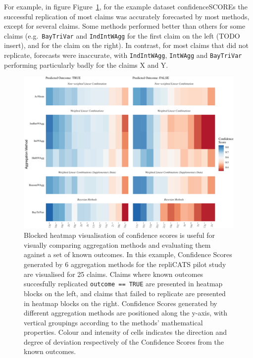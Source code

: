 \documentclass[article]{jss}
\begin{document}
For example, in figure Figure~\ref{fig-heatmap}, for the example dataset
{confidenceSCOREs} the successful replication of most claims was
accurately forecasted by most methods, except for several claims. Some
methods performed better than others for some claims
(e.g.~\texttt{BayTriVar} and \texttt{IndIntWAgg} for the first claim on
the left (TODO insert), and for the claim on the right). In contrast,
for most claims that did not replicate, forecasts were inaccurate, with
\texttt{IndIntWAgg}, \texttt{IntWAgg} and \texttt{BayTriVar} performing
particularly badly for the claims X and Y.

\begin{figure}

{\centering \includegraphics{aggreCAT_files/figure-pdf/fig-heatmap-1.pdf}

}

\caption{\label{fig-heatmap}Blocked heatmap visualisation of confidence
scores is useful for visually comparing aggregation methods and
evaluating them against a set of known outcomes. In this example,
Confidence Scores generated by 6 aggregation methods for the repliCATS
pilot study are visualised for 25 claims. Claims where known outcomes
succesfully replicated \texttt{outcome\ ==\ TRUE} are presented in
heatmap blocks on the left, and claims that failed to replicate are
presented in heatmap blocks on the right. Confidence Scores generated by
different aggregation methods are positioned along the y-axis, with
vertical groupings according to the methods' mathematical properties.
Colour and intensity of cells indicates the direction and degree of
deviation respectively of the Confidence Scores from the known
outcomes.}

\end{figure}
\end{document}
